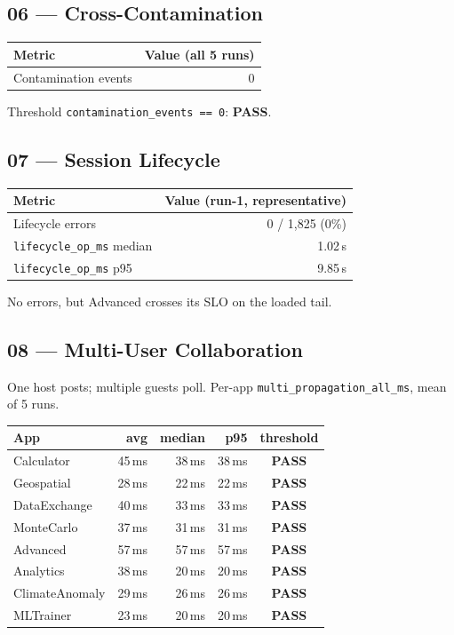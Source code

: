 \documentclass[11pt,a4paper]{article}
\newcommand{\pass}{\textcolor{pass}{\textbf{PASS}}}
\begin{document}
\subsection{06 — Cross-Contamination}

\begin{tabular}{@{}lr@{}}
\toprule
\textbf{Metric} & \textbf{Value (all 5 runs)} \\
\midrule
Contamination events & 0 \\
\bottomrule
\end{tabular}

\medskip\noindent Threshold \texttt{contamination\_events == 0}: \pass.

\subsection{07 — Session Lifecycle}

\begin{tabular}{@{}lr@{}}
\toprule
\textbf{Metric} & \textbf{Value (run-1, representative)} \\
\midrule
Lifecycle errors & 0 / 1{,}825 (0\%) \\
\texttt{lifecycle\_op\_ms} median & 1.02\,s \\
\texttt{lifecycle\_op\_ms} p95    & 9.85\,s \\
\bottomrule
\end{tabular}

\medskip\noindent No errors, but Advanced crosses its SLO on the loaded tail.

\subsection{08 — Multi-User Collaboration}

One host posts; multiple guests poll. Per-app
\texttt{multi\_propagation\_all\_ms}, mean of 5 runs.

\begin{tabular}{@{}lrrrc@{}}
\toprule
\textbf{App} & \textbf{avg} & \textbf{median} & \textbf{p95} & \textbf{threshold} \\
\midrule
Calculator      & 45\,ms & 38\,ms & 38\,ms & \pass \\
Geospatial      & 28\,ms & 22\,ms & 22\,ms & \pass \\
DataExchange    & 40\,ms & 33\,ms & 33\,ms & \pass \\
MonteCarlo      & 37\,ms & 31\,ms & 31\,ms & \pass \\
Advanced        & 57\,ms & 57\,ms & 57\,ms & \pass \\
Analytics       & 38\,ms & 20\,ms & 20\,ms & \pass \\
ClimateAnomaly  & 29\,ms & 26\,ms & 26\,ms & \pass \\
MLTrainer       & 23\,ms & 20\,ms & 20\,ms & \pass \\
\bottomrule
\end{tabular}
\end{document}
